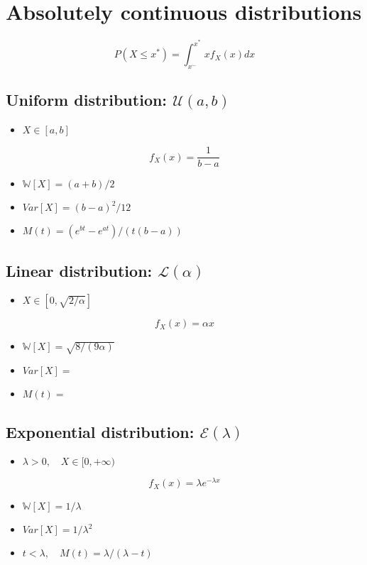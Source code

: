 \documentclass[12pt]{article}
\begin{document}
\section{Absolutely continuous distributions}
$$P(X\leq x^*)=\int_{x^-}^{x^*}xf_X(x)dx$$
\subsection{Uniform distribution: $\mathcal{U}(a,b)$}
\begin{itemize}
	\item $X\in[a,b]$
\end{itemize}
$$f_X(x)=\frac{1}{b-a}$$
\begin{itemize}
	\item $\mathbb{W}[X]=(a+b)/2$
	\item $Var[X]=(b-a)^2/12$
	\item $M(t)=(e^{bt}-e^{at})/(t(b-a))$
\end{itemize}
\subsection{Linear distribution: $\mathcal{L}(\alpha)$}
\begin{itemize}
	\item $X\in[0,\sqrt{2/\alpha}]$
\end{itemize}
$$f_X(x)=\alpha x$$
\begin{itemize}
	\item $\mathbb{W}[X]=\sqrt{8/(9\alpha)}$
	\item $Var[X]=$
	\item $M(t)=$
\end{itemize}

\subsection{Exponential distribution: $\mathcal{E}(\lambda)$}
\begin{itemize}
	\item $\lambda>0,\quad X\in[0,+\infty)$
\end{itemize}
$$f_X(x)=\lambda e^{-\lambda x}$$
\begin{itemize}
	\item $\mathbb{W}[X]=1/\lambda$
	\item $Var[X]=1/\lambda^2$
	\item $t<\lambda,\quad M(t)=\lambda/(\lambda-t)$
\end{itemize}
\end{document}
